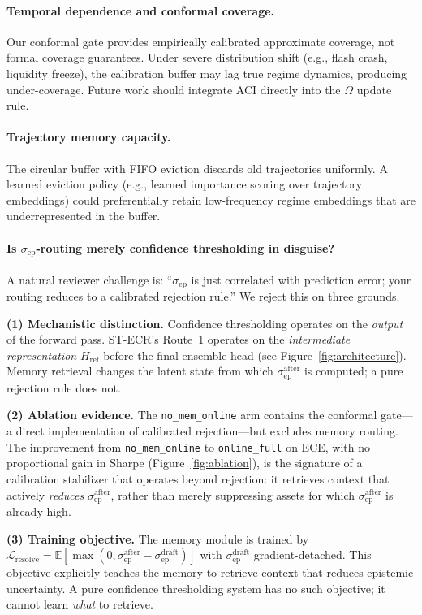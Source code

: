 \documentclass[11pt,a4paper]{article}
\newcommand{\sep}{\sigma_{\mathrm{ep}}}
\newcommand{\sepd}{\sigma_{\mathrm{ep}}^{\mathrm{draft}}}
\newcommand{\sepa}{\sigma_{\mathrm{ep}}^{\mathrm{after}}}
\newcommand{\Lres}{\mathcal{L}_{\mathrm{resolve}}}
\begin{document}
\paragraph{Temporal dependence and conformal coverage.}
Our conformal gate provides empirically calibrated approximate coverage, not
formal coverage guarantees.  Under severe distribution shift (e.g., flash crash,
liquidity freeze), the calibration buffer may lag true regime dynamics,
producing under-coverage.  Future work should integrate ACI
\citep{gibbs2021adaptive} directly into the $\Omega$ update rule.

\paragraph{Trajectory memory capacity.}
The circular buffer with FIFO eviction discards old trajectories uniformly.
A learned eviction policy (e.g., learned importance scoring over trajectory
embeddings) could preferentially retain low-frequency regime embeddings that
are underrepresented in the buffer.

\paragraph{Is $\sep$-routing merely confidence thresholding in disguise?}
A natural reviewer challenge is: ``$\sep$ is just correlated with prediction
error; your routing reduces to a calibrated rejection rule.''
We reject this on three grounds.

\textbf{(1) Mechanistic distinction.}
Confidence thresholding operates on the \emph{output} of the forward pass.
ST-ECR's Route~1 operates on the \emph{intermediate representation}
$H_{\mathrm{ref}}$ before the final ensemble head (see Figure~\ref{fig:architecture}).
Memory retrieval changes the latent state from which $\sepa$ is computed;
a pure rejection rule does not.

\textbf{(2) Ablation evidence.}
The \texttt{no\_mem\_online} arm contains the conformal gate---a direct
implementation of calibrated rejection---but excludes memory routing.
The improvement from \texttt{no\_mem\_online} to \texttt{online\_full}
on ECE, with no proportional gain in Sharpe (Figure~\ref{fig:ablation}),
is the signature of a calibration stabilizer that operates beyond
rejection: it retrieves context that actively \emph{reduces} $\sepa$,
rather than merely suppressing assets for which $\sepa$ is already high.

\textbf{(3) Training objective.}
The memory module is trained by $\Lres = \mathbb{E}[\max(0, \sepa - \sepd)]$
with $\sepd$ gradient-detached.  This objective explicitly teaches the
memory to retrieve context that reduces epistemic uncertainty.
A pure confidence thresholding system has no such objective; it cannot
learn \emph{what} to retrieve.
\end{document}
